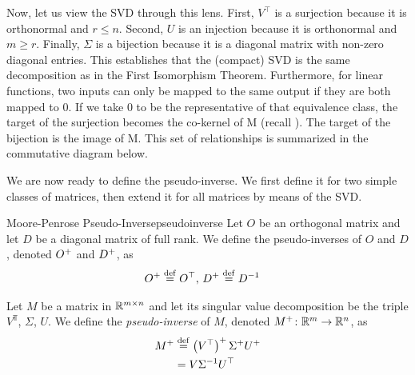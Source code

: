 \documentclass[../../thesis.tex]{subfiles}
\begin{document}
Now, let us view the SVD through this lens.
First, $V^\top$ is a surjection because
it is orthonormal and $r \leq n$.
Second, $U$ is an injection because
it is orthonormal and $m \geq r$.
Finally, $\Sigma$ is a bijection
because it is a diagonal matrix with non-zero diagonal entries.
This establishes that the (compact) SVD
is the same decomposition as in the First Isomorphism Theorem.
Furthermore, for linear functions,
two inputs can only be mapped to the same output
if they are both mapped to $0$.
If we take $0$ to be the representative of that equivalence class,
the target of the surjection becomes the co-kernel of M
(recall ).
The target of the bijection is the image of M.
This set of relationships is summarized
in the commutative diagram below.

\begin{center}
\end{center}

We are now ready to define the pseudo-inverse.
We first define it for two simple classes of matrices,
then extend it for all matrices by means of the SVD.\@

\begin{definition}{Moore-Penrose Pseudo-Inverse}{pseudoinverse}
	Let $O$ be an orthogonal matrix
	and let $D$ be a diagonal matrix of full rank.
	We define the pseudo-inverses of $O$ and $D$,
	denoted $O^{+}$ and $D^{+}$, as
	\begin{align}
		O^{+} \stackrel{\small \mathrm{def}}{=} O^{\top},\
		& D^{+} \stackrel{\small \mathrm{def}}{=} D^{-1}
	\end{align}

	Let $M$ be a matrix in $\mathbb{R}^{m \times n}$
	and let its singular value decomposition be the triple
	$V^\Top$, $\Sigma$, $U$.
	We define the \emph{pseudo-inverse} of $M$,
	denoted $M^{+}\colon \mathbb{R}^m \to \mathbb{R}^n$, as
	\begin{align}
		M^{+}
		&\stackrel{\small \mathrm{def}}{=} \left(V^{\top}\right)^{+}\Sigma^{+}U^{+}\\
		&= V \Sigma^{-1} U^\top
	\end{align}
\end{definition}
\end{document}

